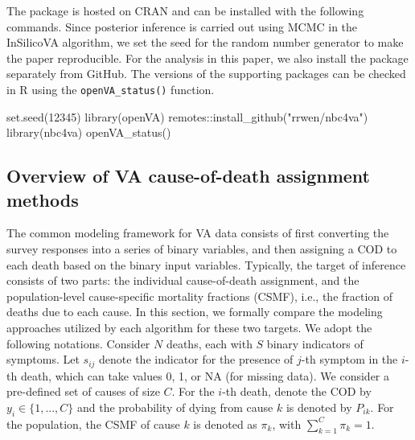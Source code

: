 The  package is hosted on CRAN and can be installed with
the following commands. Since posterior inference is carried out using
MCMC in the InSilicoVA algorithm, we set the seed for the random number
generator to make the paper reproducible. For the analysis in this
paper, we also install the  package separately from GitHub.
The versions of the supporting packages can be checked in R using the
\texttt{openVA\_status()} function.

\begin{Schunk}
\begin{Sinput}
set.seed(12345)
library(openVA)
remotes::install_github("rrwen/nbc4va")
library(nbc4va)
openVA_status()
\end{Sinput}
\end{Schunk}

\hypertarget{overview-of-va-cause-of-death-assignment-methods}{%
\subsection{Overview of VA cause-of-death assignment
methods}\label{overview-of-va-cause-of-death-assignment-methods}}

The common modeling framework for VA data consists of first converting
the survey responses into a series of binary variables, and then
assigning a COD to each death based on the binary input variables.
Typically, the target of inference consists of two parts: the individual
cause-of-death assignment, and the population-level cause-specific
mortality fractions (CSMF), i.e., the fraction of deaths due to each
cause. In this section, we formally compare the modeling approaches
utilized by each algorithm for these two targets. We adopt the following
notations. Consider \(N\) deaths, each with \(S\) binary indicators of
symptoms. Let \(s_{ij}\) denote the indicator for the presence of
\(j\)-th symptom in the \(i\)-th death, which can take values 0, 1, or
NA (for missing data). We consider a pre-defined set of causes of size
\(C\). For the \(i\)-th death, denote the COD by
\(y_i \in \{1, ..., C\}\) and the probability of dying from cause \(k\)
is denoted by \(P_{ik}\). For the population, the CSMF of cause \(k\) is
denoted as \(\pi_k\), with \(\sum_{k=1}^C \pi_k = 1\).

